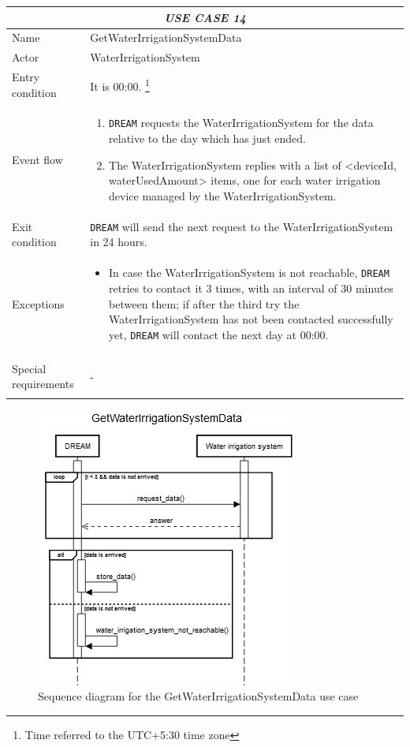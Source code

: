 \documentclass{article}
\begin{document}
\centering
\begin{longtable}{|p{3.5cm}|m{8cm}|}
 \hline
 \multicolumn{2}{|c|}{\cellcolor{white}\emph{USE CASE 14}} \\
 \endfirsthead
 \endhead
 \endfoot
 \endlastfoot
 \hline
 Name & GetWaterIrrigationSystemData\\
 \hline
 Actor & WaterIrrigationSystem\\
 \hline
 Entry condition & It is 00:00. \footnote{Time referred to the UTC+5:30 time zone}\\
 \hline
 Event flow & \begin{enumerate}
    \item \verb|DREAM| requests the WaterIrrigationSystem for the data relative to the day which has just ended.
    \item The WaterIrrigationSystem replies with a list of <deviceId, waterUsedAmount> items, one for each water irrigation device managed by the WaterIrrigationSystem.
 \end{enumerate}\\
 \hline
 Exit condition & \verb|DREAM| will send the next request to the WaterIrrigationSystem in 24 hours.\\
 \hline
 Exceptions & \begin{itemize}
     \item In case the WaterIrrigationSystem is not reachable, \verb|DREAM| retries to contact it 3 times, with an interval of 30 minutes between them; if after the third try the WaterIrrigationSystem has not been contacted successfully yet, \verb|DREAM| will contact the next day at 00:00.
 \end{itemize}\\
 \hline
 Special requirements &\begin{itemize}
     -
 \end{itemize}\\
 \hline
\end{longtable}
\begin{figure}[H]
    \centering
    \includegraphics[scale=0.75]{sequence_diagrams/GetWaterIrrigationSystemData}
    \caption{Sequence diagram for the GetWaterIrrigationSystemData use case}
\end{figure}
\end{document}
